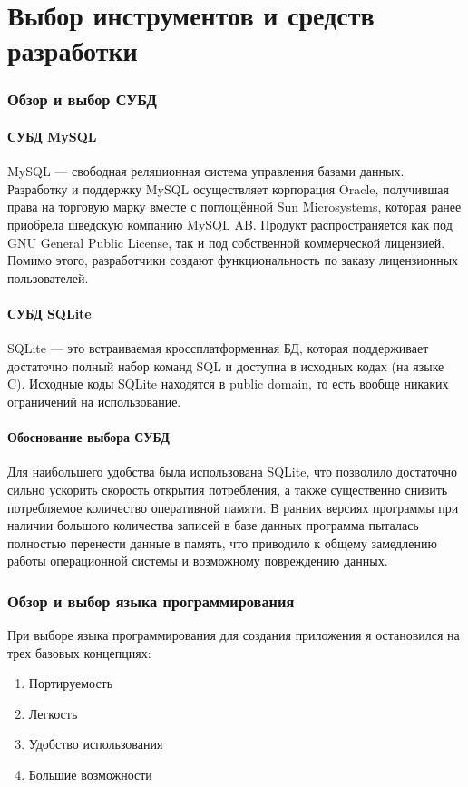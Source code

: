 \part{Выбор инструментов и средств разработки}
\section{Обзор и выбор СУБД}
\subsection{СУБД MySQL}
MySQL — свободная реляционная система управления базами данных. Разработку и поддержку MySQL осуществляет корпорация Oracle, получившая права на торговую марку вместе с поглощённой Sun Microsystems, которая ранее приобрела шведскую компанию MySQL AB. Продукт распространяется как под GNU General Public License, так и под собственной коммерческой лицензией. Помимо этого, разработчики создают функциональность по заказу лицензионных пользователей.\cite{mysql}\\
\subsection{СУБД SQLite}
SQLite — это встраиваемая кроссплатформенная БД, которая поддерживает достаточно полный набор команд SQL и доступна в исходных кодах (на языке C). Исходные коды SQLite находятся в public domain, то есть вообще никаких ограничений на использование.\\
\subsection{Обоснование выбора СУБД}
Для наибольшего удобства была использована SQLite, что позволило достаточно сильно ускорить скорость открытия потребления, а также существенно снизить потребляемое количество оперативной памяти. В ранних версиях программы при наличии большого количества записей в базе данных программа пыталась полностью перенести данные в память, что приводило к общему замедлению работы операционной системы и возможному повреждению данных.

\section{Обзор и выбор языка программирования}
При выборе языка программирования для создания приложения я остановился на трех базовых концепциях:

\begin{enumerate}
	\item Портируемость
	\item Легкость
	\item Удобство использования
	\item Большие возможности
\end{enumerate}

